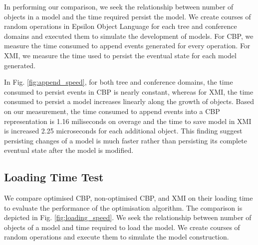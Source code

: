 \documentclass{llncs}
\begin{document}
In performing our comparison, we seek the relationship between number of objects in a model and the time required persist the model. We create courses of random operations in Epsilon Object Language \cite{kolovos2006epsilon} for each tree and conference domains and executed them to simulate the development of models. For CBP, we measure the time consumed to append events generated for every operation. For XMI, we measure the time used to persist the eventual state for each model generated. 

In Fig. \ref{fig:append_speed}, for both tree and conference domains, the time consumed to persist events in CBP is nearly constant, whereas for XMI, the time consumed to persist a model increases linearly along the growth of objects. Based on our measurement, the time consumed to append events into a CBP representation is 1.16 miliseconds on overage and the time to save model in XMI is increased 2.25 microseconds for each additional object. This finding suggest persisting changes of a model is much faster rather than persisting its complete eventual state after the model is modified.    

\subsection{Loading Time Test}
\label{subsec:loading_time_test}
We compare optimised CBP, non-optimised CBP, and XMI on their loading time to evaluate the performance of the optimisation algorithm. The  comparison is depicted in Fig. \ref{fig:loading_speed}. We seek the relationship between number of objects of a model and time required to load the model. We create courses of random operations and execute them to simulate the model construction.   
\end{document}

